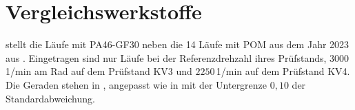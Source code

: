 
\section{Vergleichswerkstoffe}
\label{sec:vergleichswerkstoffe}

 stellt die Läufe mit PA46-GF30 neben die 14 Läufe mit POM aus dem Jahr 2023 aus . Eingetragen sind nur Läufe bei der Referenzdrehzahl ihres Prüfstands, $3000$\,1/min am Rad auf dem Prüfstand KV3 und $2250$\,1/min auf dem Prüfstand KV4. Die Geraden stehen in , angepasst wie in  mit der Untergrenze $0{,}10$ der Standardabweichung.

